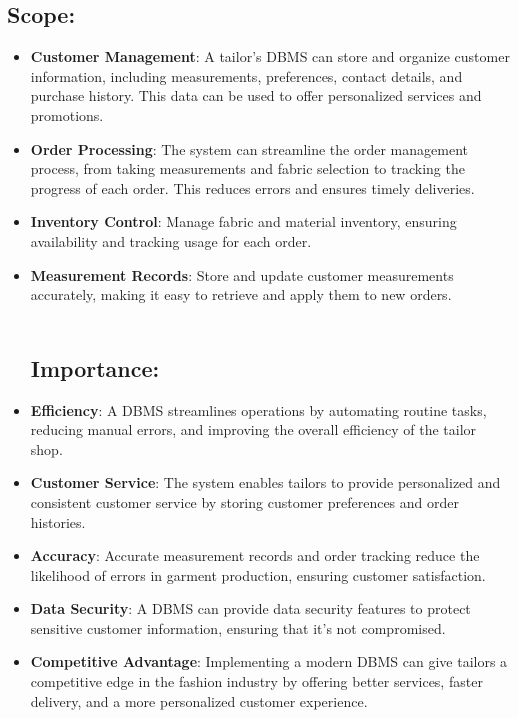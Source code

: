 \documentclass[12pt, letter paper]{report}
\begin{document}
{\subsection{Scope:}
\begin{spacing}{1.5}
\begin{itemize}
\item \textbf{Customer Management}: A tailor's DBMS can store and organize customer information, including measurements, preferences, contact details, and purchase history. This data can be used to offer personalized services and promotions.
\item \textbf{Order Processing}: The system can streamline the order management process, from taking measurements and fabric selection to tracking the progress of each order. This reduces errors and ensures timely deliveries.
\item\textbf{Inventory Control}: Manage fabric and material inventory, ensuring availability and tracking usage for each order.
\item\textbf{Measurement Records}: Store and update customer measurements accurately, making it easy to retrieve and apply them to new orders.
\\
\\
\subsection{Importance:}
\item\textbf{Efficiency}: A DBMS streamlines operations by automating routine tasks, reducing manual errors, and improving the overall efficiency of the tailor shop.
\item\textbf{Customer Service}: The system enables tailors to provide personalized and consistent customer service by storing customer preferences and order histories.
\item\textbf{Accuracy}: Accurate measurement records and order tracking reduce the likelihood of errors in garment production, ensuring customer satisfaction.
\item \textbf{Data Security}: A DBMS can provide data security features to protect sensitive customer information, ensuring that it's not compromised.
\item \textbf{Competitive Advantage}: Implementing a modern DBMS can give tailors a competitive edge in the fashion industry by offering better services, faster delivery, and a more personalized customer experience.
\end{itemize}
\end{spacing}
}
\end{document}
